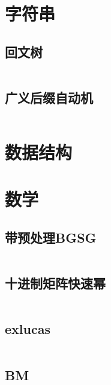 \documentclass[a4paper,11pt]{article}
\begin{document}






\newpage
\section{字符串}

\subsection{回文树}
\inputminted[breaklines]{c++}{String/pam.cpp}

\subsection{广义后缀自动机}
\inputminted[breaklines]{c++}{String/sam.cpp}




\newpage
\section{数据结构}











\newpage
\section{数学} %

\subsection{带预处理BGSG}
\inputminted[breaklines]{c++}{Math/BGSG.cpp}

\subsection{十进制矩阵快速幂}
\inputminted[breaklines]{c++}{Math/快速幂.cpp}

\subsection{exlucas}
\inputminted[breaklines]{c++}{Math/exlucas.cpp}

\subsection{BM}
\inputminted[breaklines]{c++}{Math/BM.cpp}
\end{document}
